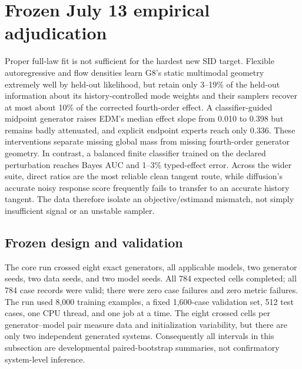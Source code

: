\section{Frozen July 13 empirical adjudication}
\label{sec:stable-results}

\begin{takeaway}
Proper full-law fit is not sufficient for the hardest new SID target.  Flexible
autoregressive and flow densities learn G8's static multimodal geometry extremely
well by held-out likelihood, but retain only 3--19\% of the held-out information
about its history-controlled mode weights and their samplers recover at most about
10\% of the corrected fourth-order effect.  A classifier-guided midpoint generator
raises EDM's median effect slope from 0.010 to 0.398 but remains badly attenuated,
and explicit endpoint experts reach only 0.336.  These interventions separate
missing global mass from missing fourth-order generator geometry.  In contrast, a balanced finite
classifier trained on the declared perturbation reaches Bayes AUC and 1--3\%
typed-effect error.  Across the wider suite, direct ratios are the most reliable
clean tangent route, while diffusion's accurate noisy response score frequently
fails to transfer to an accurate history tangent.  The data therefore isolate an
objective/estimand mismatch, not simply insufficient signal or an unstable sampler.
\end{takeaway}

\subsection{Frozen design and validation}

The core run crossed eight exact generators, all applicable models, two generator
seeds, two data seeds, and two model seeds.  All 784 expected cells completed; all
784 case records were valid; there were zero case failures and zero metric
failures.  The run used 8,000 training examples, a fixed 1,600-case validation
set, 512 test cases, one CPU thread, and one job at a time.  The eight crossed
cells per generator--model pair measure data and initialization variability, but
there are only two independent generated systems.  Consequently all intervals in
this subsection are developmental paired-bootstrap summaries, not confirmatory
system-level inference.

